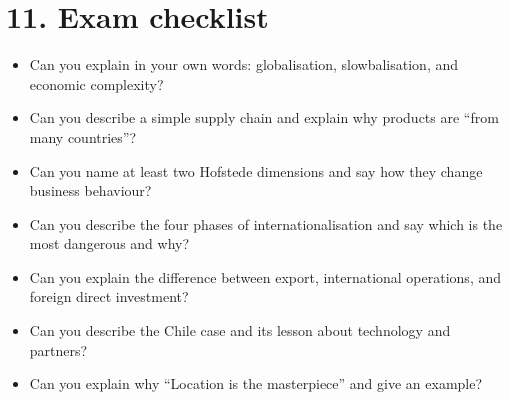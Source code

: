 \documentclass[10pt,a4paper]{article}
\begin{document}
\section*{11. Exam checklist}
\begin{itemize}
\item Can you explain in your own words: globalisation, slowbalisation, and economic complexity?
\item Can you describe a simple supply chain and explain why products are “from many countries”?
\item Can you name at least two Hofstede dimensions and say how they change business behaviour?
\item Can you describe the four phases of internationalisation and say which is the most dangerous and why?
\item Can you explain the difference between export, international operations, and foreign direct investment?
\item Can you describe the Chile case and its lesson about technology and partners?
\item Can you explain why “Location is the masterpiece” and give an example?
\end{itemize}
\end{document}
